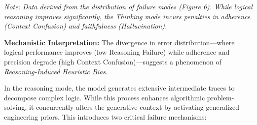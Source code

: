 \documentclass{article}
\theoremstyle{plain}
\theoremstyle{definition}
\theoremstyle{remark}
\begin{document}
\begin{table}[htbp]
    \centering
    \caption{Performance Metrics: Doubao-1.6 Reasoning Mode vs. Standard Mode}

    \label{tab:failure_modes_full}
    \vspace{0.1cm}
    \par
    \footnotesize{\textit{Note: Data derived from the distribution of failure modes (Figure 6). While logical reasoning improves significantly, the Thinking mode incurs penalties in adherence (Context Confusion) and faithfulness (Hallucination).}}
\end{table}

\noindent \textbf{Mechanistic Interpretation:} The divergence in error distribution—where logical performance improves (low Reasoning Failure) while adherence and precision degrade (high Context Confusion)—suggests a phenomenon of \textit{Reasoning-Induced Heuristic Bias}.

In the reasoning mode, the model generates extensive intermediate traces to decompose complex logic. While this process enhances algorithmic problem-solving, it concurrently alters the generative context by activating generalized engineering priors. This introduces two critical failure mechanisms:
\end{document}
